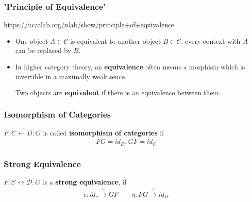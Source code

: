 \documentclass[Total.tex]{subfiles}
\begin{document}
				\subsubsection{'Principle of Equivalence'}
				
				\url{https://ncatlab.org/nlab/show/principle+of+equivalence}
				
				
				\begin{Def}
					\begin{itemize}
						\item One object $A\in \mathcal{C}$ is equivalent to another object $B\in \mathcal{C}$, every context with $A$ can be replaced by $B$.
						
						\item In higher category theory, an \textbf{equivalence} often means a morphism which is invertible in a maximally weak sence.
						
						Two objects are \textbf{equivalent} if there is an equivalence between them.
					\end{itemize}
				\end{Def}
				\subsubsection{Isomorphism of Categories}
					\begin{Def}
						$F:C\stackrel{\rightarrow}{\leftarrow} D:G$ is called \textbf{isomorphism of categories} if
						\begin{gather*}
							FG=id_D,GF=id_C
						\end{gather*}
					\end{Def}
				\subsubsection{Strong Equivalence}
					\begin{Def}
						$F:\mathcal{C}\leftrightarrow \mathcal{D}:G$ is a \textbf{strong equivalence}, if
						\begin{gather*}
							\epsilon:id_c\stackrel{\cong}{\rightarrow} GF\qquad \eta:FG\stackrel{\cong}{\rightarrow} id_D
						\end{gather*}
					\end{Def}
\end{document}

